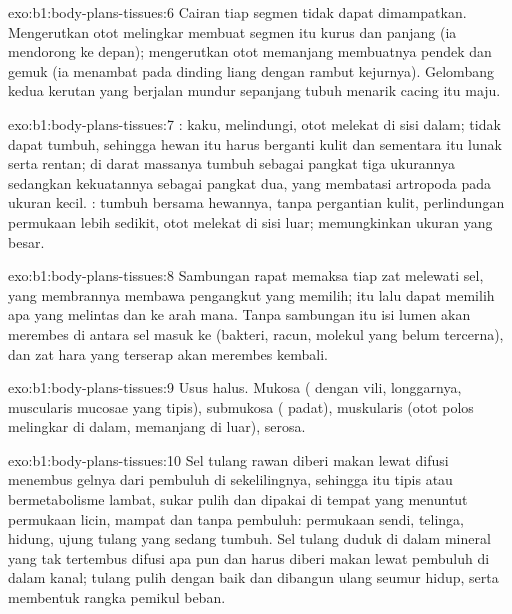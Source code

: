 \begin{solution}{exo:b1:body-plans-tissues:6}
Cairan  tiap segmen tidak dapat dimampatkan. Mengerutkan otot
melingkar membuat segmen itu kurus dan panjang (ia mendorong ke depan);
mengerutkan otot memanjang membuatnya pendek dan gemuk (ia menambat pada
dinding liang dengan rambut kejurnya). Gelombang kedua kerutan yang
berjalan mundur sepanjang tubuh menarik cacing itu maju.
\end{solution}

\begin{solution}{exo:b1:body-plans-tissues:7}
: kaku, melindungi, otot melekat di sisi dalam; tidak dapat
tumbuh, sehingga hewan itu harus berganti kulit dan sementara itu lunak
serta rentan; di darat massanya tumbuh sebagai pangkat tiga ukurannya
sedangkan kekuatannya sebagai pangkat dua, yang membatasi artropoda pada
ukuran kecil. : tumbuh bersama hewannya, tanpa pergantian
kulit, perlindungan permukaan lebih sedikit, otot melekat di sisi luar;
memungkinkan ukuran yang besar.
\end{solution}

\begin{solution}{exo:b1:body-plans-tissues:8}
Sambungan rapat memaksa tiap zat melewati sel, yang membrannya membawa
pengangkut yang memilih;  itu lalu dapat memilih apa yang
melintas dan ke arah mana. Tanpa sambungan itu isi lumen akan merembes
di antara sel masuk ke  (bakteri, racun, molekul yang
belum tercerna), dan zat hara yang terserap akan merembes kembali.
\end{solution}

\begin{solution}{exo:b1:body-plans-tissues:9}
Usus halus. Mukosa ( dengan vili,  longgarnya,
muscularis mucosae yang tipis), submukosa ( padat),
muskularis (otot polos melingkar di dalam, memanjang di luar),
serosa.
\end{solution}

\begin{solution}{exo:b1:body-plans-tissues:10}
Sel tulang rawan diberi makan lewat difusi menembus gelnya dari
pembuluh di sekelilingnya, sehingga  itu tipis atau
bermetabolisme lambat, sukar pulih dan dipakai di tempat yang menuntut
permukaan licin, mampat dan tanpa pembuluh: permukaan sendi, telinga,
hidung, ujung tulang yang sedang tumbuh. Sel tulang duduk di dalam
mineral yang tak tertembus difusi apa pun dan harus diberi makan lewat
pembuluh di dalam kanal; tulang pulih dengan baik dan dibangun ulang
seumur hidup, serta membentuk rangka pemikul beban.
\end{solution}

